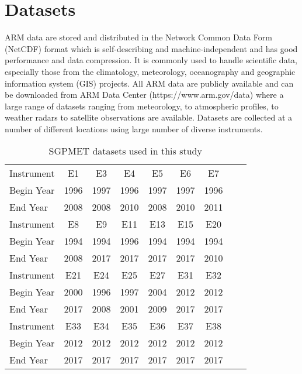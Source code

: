\section{Datasets}
ARM data are stored and distributed in the Network Common Data Form (NetCDF) format which
is self-describing and machine-independent \cite{rew1990netcdf, NetCDF}
and has good performance and data compression. It is commonly used to
handle scientific data, especially those from the climatology,
meteorology, oceanography and geographic information system (GIS) projects. 
All ARM data are publicly available and can be downloaded from ARM Data Center
(https://www.arm.gov/data) where a large range of datasets ranging  
from meteorology, to atmospheric profiles, to weather radars to
satellite observations are available. Datasets are collected at a number
of different locations using large number of diverse
instruments. 

\begin{table}[ht]
\caption{SGPMET datasets used in this study}
\label{tab:datasets}
\centering
\begin{tabular}{|l|c|c|c|c|c|c|c|c|}
\hline
Instrument & E1 & E3 & E4 & E5 & E6 & E7\\
Begin Year & 1996 & 1997 & 1996 & 1997 & 1997 & 1996\\
End Year & 2008 & 2008 & 2010 & 2008 & 2010 & 2011\\
\hline
Instrument & E8 & E9 & E11 & E13 & E15 & E20\\
Begin Year & 1994 & 1994 & 1996 & 1994 & 1994 & 1994\\
End Year & 2008 & 2017 & 2017 & 2017 & 2017 & 2010\\
\hline
Instrument & E21 & E24 & E25 & E27 & E31 & E32\\
Begin Year & 2000 & 1996 & 1997 & 2004 & 2012 & 2012\\
End Year & 2017 & 2008 & 2001 & 2009 & 2017 & 2017\\
\hline
Instrument & E33 & E34 & E35 & E36 & E37 & E38\\
Begin Year & 2012 & 2012 & 2012 & 2012 & 2012 & 2012\\
End Year & 2017 & 2017 & 2017 & 2017 & 2017 & 2017\\
\hline
\end{tabular}
\end{table}

